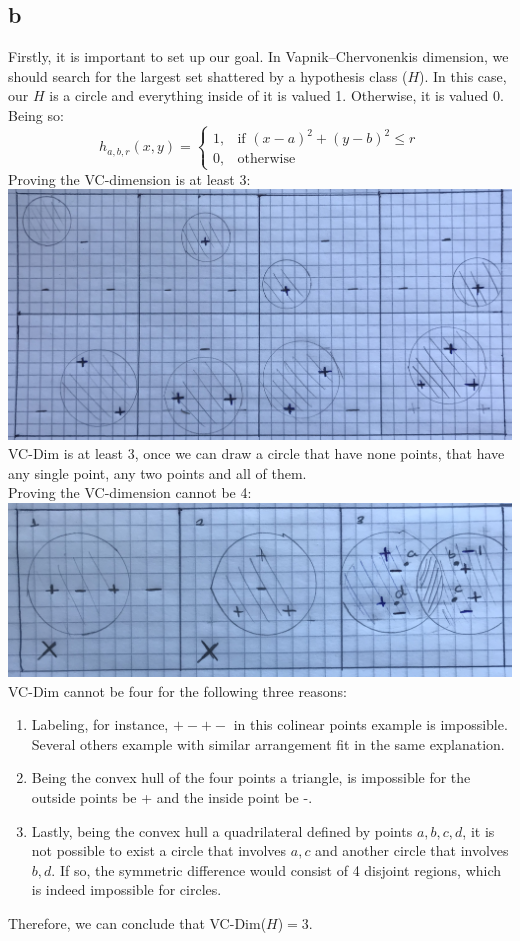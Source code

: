 \subsection{b}
Firstly, it is important to set up our goal. In Vapnik–Chervonenkis dimension, we should search for the largest set shattered by a hypothesis class ($H$). In this case, our $H$ is a circle and everything inside of it is valued 1. Otherwise, it is valued 0. Being so: \\
$$
h_{a,b,r}(x,y)=
        \begin{cases}
			1, & \text{if $(x-a)^2+(y-b)^2 \leq r$}\\
            0, & \text{otherwise}
		 \end{cases}
$$
\bigbreak
Proving the VC-dimension is at least 3:\\
\bigbreak
\includegraphics[width=\textwidth,height=\textheight,keepaspectratio]{3dim.jpg}\\
\bigbreak
VC-Dim is at least 3, once we can  draw a circle that have none points, that have any single point, any two points and all of them.\\
\bigbreak
Proving the VC-dimension cannot be 4:\\
\bigbreak
\includegraphics[width=\textwidth,height=\textheight,keepaspectratio]{4dim.jpg}
\bigbreak
VC-Dim cannot be four for the following three reasons:
\begin{enumerate}
  \item Labeling, for instance, $+ - + -$ in this colinear points example is impossible. Several others example with similar arrangement fit in the same explanation. 
  \item Being the convex hull of the four points a triangle, is impossible for the outside points be + and the inside point be -.
  \item Lastly, being the convex hull a quadrilateral defined by points {$a,b,c,d$}, it is not possible to exist a circle that involves $a,c$ and another circle that involves $b,d$. If so, the symmetric difference would consist of 4 disjoint regions, which is indeed impossible for circles.
\end{enumerate}
\bigbreak
Therefore, we can conclude that VC-Dim($H$)$ = 3$. 
